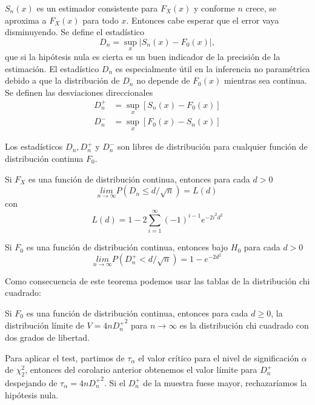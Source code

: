 	$S_n(x)$ es un estimador consistente para $F_X(x)$ y 
conforme $n$ crece, se aproxima a $F_X(x)$ para todo $x$. 
Entonces cabe esperar que el error vaya disminuyendo. Se 
define el estadístico
	\[ D_n = \underset{x}{\sup} 
				\vert S_n(x) - F_0(x) \vert, \]
	que si la hipótesis nula es cierta es un buen indicador 
de la precisión de la estimación. El estadístico $D_n$ es 
especialmente útil en la inferencia no paramétrica debido a 
que la distribución de $D_n$ no depende de $F_0(x)$ mientras 
sea continua. Se definen las desviaciones direccionales
\begin{align*}
		D_n^+ &= \underset{x}{\sup} [S_n(x) - F_0(x)]  		\\
		D_n^- &= \underset{x}{\sup} [F_0(x) - S_n(x)]
\end{align*}	 
	
\begin{teorema}
	Los estadísticos $D_n, D_n^+$ y $D_n^-$ son libres de 
distribución para cualquier función de distribución continua
$F_0$.
\end{teorema}
	
\begin{teorema}
	Si $F_X$ es una función de distribución continua, 
entonces para cada $d>0$
	\[ \underset{n \rightarrow \infty}{lim}
			P(D_n \leq d/\sqrt{n}) = L(d) \]
	con
	\[ L(d) = 1 - 2 \sum\limits_{i=1}^\infty 
			(-1)^{i-1} e^{-2i^2d^2}	\]
\end{teorema}

\begin{teorema}
	Si $F_0$ es una función de distribución continua, 
entonces bajo $H_0$ para cada $d>0$
	\[ \underset{n \rightarrow \infty}{lim}
			P(D_n^+ < d/\sqrt{n}) = 1-e^{-2d^2} \]
\end{teorema}	
	Como consecuencia de este teorema podemos usar las tablas
de la distribución chi cuadrado:
	
\begin{corolario}
	Si $F_0$ es una función de distribución continua, 
entonces para cada $d \geq 0$, la distribución límite de 
$V = 4n {D_n^+}^2$ para $n \rightarrow \infty$ es la 
distribución chi cuadrado con dos grados de libertad.
\end{corolario}	
	
	Para aplicar el test, partimos de $\tau_\alpha$ el valor
crítico para el nivel de significación $\alpha$ de 
$\chi^2_2$, entonces del corolario anterior obtenemos el 
valor límite para $D^+_n$ despejando de $\tau_\alpha
= 4n {D_n^+}^2$. Si el $D^+_n$ de la muestra fuese mayor,
rechazaríamos la hipótesis nula.
	
